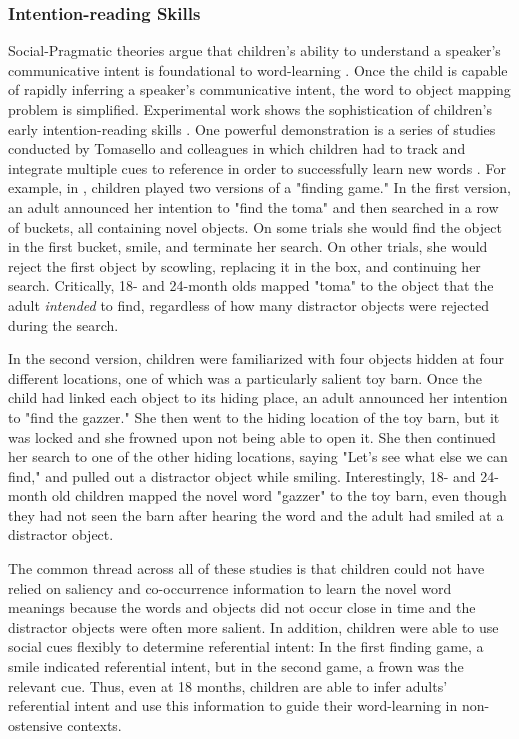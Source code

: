 \documentclass[man]{apa2}
\begin{document}
\subsubsection{Intention-reading Skills}
Social-Pragmatic theories argue that children's ability to understand a speaker's communicative intent is foundational to word-learning \cite{bloom2002children, baldwin1995understanding,tomasello2009constructing}. Once the child is capable of rapidly inferring a speaker's communicative intent, the word to object mapping problem is simplified. Experimental work shows the sophistication of children's early intention-reading skills \cite{baldwin1993infants,baldwin2001links}. One powerful demonstration is a series of studies conducted by Tomasello and colleagues in which children had to track and integrate multiple cues to reference in order to successfully learn new words \cite{akhtar1996role,tomasello1996eighteen,tomasello1994learning}. For example, in , children played two versions of a "finding game." In the first version, an adult announced her intention to "find the toma" and then searched in a row of buckets, all containing novel objects. On some trials she would find the object in the first bucket, smile, and terminate her search. On other trials, she would reject the first object by scowling, replacing it in the box, and continuing her search. Critically, 18- and 24-month olds mapped "toma" to the object that the adult \emph{intended} to find, regardless of how many distractor objects were rejected during the search. 

In the second version, children were familiarized with four objects hidden at four different locations, one of which was a particularly salient toy barn. Once the child had linked each object to its hiding place, an adult announced her intention to "find the gazzer." She then went to the hiding location of the toy barn, but it was locked and she frowned upon not being able to open it. She then continued her search to one of the other hiding locations, saying "Let's see what else we can find," and pulled out a distractor object while smiling. Interestingly, 18- and 24-month old children mapped the novel word "gazzer" to the toy barn, even though they had not seen the barn after hearing the word and the adult had smiled at a distractor object. 

The common thread across all of these studies is that children could not have relied on saliency and co-occurrence information to learn the novel word meanings because the words and objects did not occur close in time and the distractor objects were often more salient. In addition, children were able to use social cues flexibly to determine referential intent: In the first finding game, a smile indicated referential intent, but in the second game, a frown was the relevant cue. Thus, even at 18 months, children are able to infer adults' referential intent and use this information to guide their word-learning in non-ostensive contexts.
\end{document}

